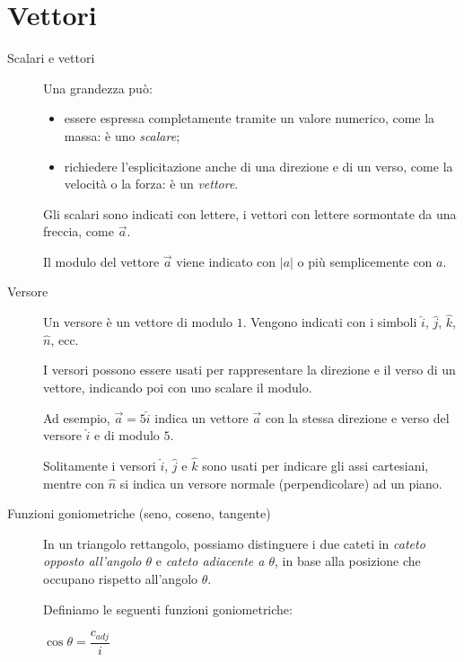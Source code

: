 \documentclass[a4paper,11pt,italian]{article}
\begin{document}
\maketitle
\vspace{8em}
\tableofcontents

\newpage
\section{Vettori}


\begin{description}
  \item[Scalari e vettori] 
  Una grandezza può:
\begin{itemize}
  \item essere espressa completamente tramite un valore numerico, come la massa: è uno \emph{scalare};
  \item richiedere l'esplicitazione anche di una direzione e di un verso, come la velocità o la forza: è un \emph{vettore}.
\end{itemize}
  Gli scalari sono indicati con lettere, i vettori con lettere sormontate da una freccia, come $ \vec{a} $.
  
  Il modulo del vettore $ \vec{a} $ viene indicato con $ |a| $ o più semplicemente con $ a $.
  
  \item[Versore]
  Un versore è un vettore di modulo $ 1 $. Vengono indicati con i simboli $ \hat{i}  $, $ \hat{j} $, $ \hat{k} $, $ \hat{n} $, ecc.
  
  I versori possono essere usati per rappresentare la direzione e il verso di un vettore, indicando poi con uno scalare il modulo.
  
  Ad esempio, $ \vec{a} = 5\hat{i}  $ indica un vettore $ \vec{a} $ con la stessa direzione e verso del versore $ \hat{i} $ e di modulo $ 5 $.
  
  Solitamente i versori $ \hat{i}  $, $ \hat{j} $ e $ \hat{k} $ sono usati per indicare gli assi cartesiani, 
  mentre con $ \hat{n} $ si indica un versore normale (perpendicolare) ad un piano.
  
  \item[Funzioni goniometriche (seno, coseno, tangente)]
  In un triangolo rettangolo, possiamo distinguere i due cateti in \emph{cateto opposto all'angolo $ \theta $} 
  e \emph{cateto adiacente a $ \theta $}, in base alla posizione che occupano rispetto all'angolo $ \theta $.
  
  Definiamo le seguenti funzioni goniometriche:
\begin{multicols}{3}
  \begin{center}
  $ \cos\theta = \dfrac{c_{adj}}{i} $
  

\end{center}
\end{multicols}
\end{description}
\end{document}
